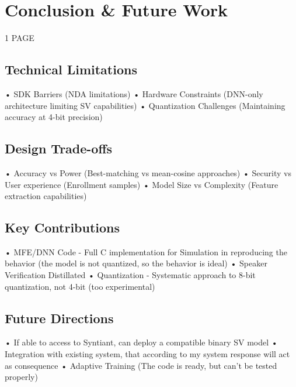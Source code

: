 \chapter{Conclusion \& Future Work}

1 PAGE\newline\newline

\label{cha:conclusion}
\section{Technical Limitations}
\label{sec:technical limits}
• SDK Barriers (NDA limitations)\newline
• Hardware Constraints (DNN-only architecture limiting SV capabilities)\newline
• Quantization Challenges (Maintaining accuracy at 4-bit precision)\newline

\section{Design Trade-offs}
\label{sec:design trade-offs}
• Accuracy vs Power (Best-matching vs mean-cosine approaches)\newline
• Security vs User experience (Enrollment samples)\newline
• Model Size vs Complexity (Feature extraction capabilities)\newline

\section{Key Contributions}
\label{sec:key contributions}
• MFE/DNN Code - Full C implementation for Simulation in reproducing the behavior (the model is not quantized, so the behavior is ideal)\newline 
• Speaker Verification Distillated\newline 
• Quantization - Systematic approach to 8-bit quantization, not 4-bit (too experimental)\newline 

\section{Future Directions}
\label{sec:future directions}
• If able to access to Syntiant, can deploy a compatible binary SV model\newline 
• Integration with existing system, that according to my system response will act as consequence\newline
• Adaptive Training (The code is ready, but can't be tested properly)\newline 

\newpage